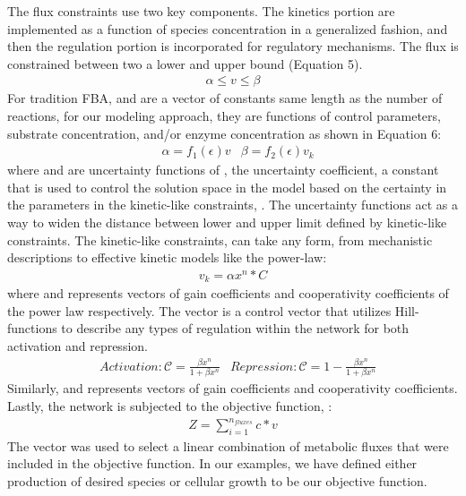 \documentclass[12pt]{article}
\begin{document}
The flux constraints use two key components. The kinetics portion are implemented as a function of species concentration in a generalized fashion, and then the regulation portion is incorporated for regulatory mechanisms. The flux is constrained between two a lower and upper bound (Equation 5).
\begin{equation}\label{eq:FB1}
\begin{aligned}
\alpha \le v \le\beta   
\end{aligned}
\end{equation}
For tradition FBA,  and  are a vector of constants same length as the number of reactions, for our modeling approach, they are functions of control parameters, substrate concentration, and/or enzyme concentration as shown in Equation 6:
\begin{equation}\label{eq:FB2}
\begin{aligned}
&\alpha=f_1 (\epsilon)v
&\beta=f_2  (\epsilon)v_k
\end{aligned}
\end{equation}
where and  are uncertainty functions of  , the uncertainty coefficient, a constant that is used to control the solution space in the model based on the certainty in the parameters in the kinetic-like constraints, . The uncertainty functions act as a way to widen the distance between lower and upper limit defined by kinetic-like constraints. The kinetic-like constraints,  can take any form, from mechanistic descriptions to effective kinetic models like the power-law:
\begin{equation}\label{eq:FB3}
\begin{aligned}
v_k= \alpha x^n*C          
\end{aligned}
\end{equation}
where  and  represents vectors of gain coefficients and cooperativity coefficients of the power law respectively. The  vector is a control vector that utilizes Hill-functions to describe any types of regulation within the network for both activation and repression.
\begin{equation}\label{eq:HillFunction}
\begin{aligned}
&Activation: \mathcal{C} = \frac{\beta x^n}{1+\beta x^n}
&Repression: \mathcal{C} = 1 - \frac{\beta x^n}{1+\beta x^n}
\end{aligned}
\end{equation}
Similarly,  and  represents vectors of gain coefficients and cooperativity coefficients.
Lastly, the network is subjected to the objective function, :
\begin{equation}\label{eq:OBJ}
\begin{aligned}
Z = \sum_{i=1}^{n_{fluxes}} c*v
\end{aligned}
\end{equation}
The vector  was used to select a linear combination of metabolic fluxes that were included in the objective function. In our examples, we have defined either production of desired species or cellular growth to be our objective function. 
\end{document}
